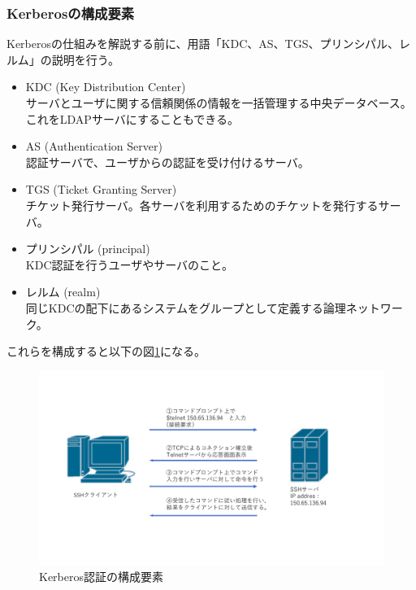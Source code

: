 \documentclass[11pt,a4j,titlepage]{jreport}
\begin{document}
\subsubsection*{Kerberosの構成要素}
Kerberosの仕組みを解説する前に、用語「KDC、AS、TGS、プリンシパル、レルム」の説明を行う。
\begin{itemize}
    \setlength{\parskip}{0.1cm} %
    \setlength{\itemsep}{0.1cm} 
    \item KDC (Key Distribution Center)\mbox{}\\サーバとユーザに関する信頼関係の情報を一括管理する中央データベース。これをLDAPサーバにすることもできる。
    \item AS (Authentication Server) \mbox{}\\認証サーバで、ユーザからの認証を受け付けるサーバ。
    \item TGS (Ticket Granting Server) \mbox{}\\チケット発行サーバ。各サーバを利用するためのチケットを発行するサーバ。
    \item プリンシパル (principal) \mbox{}\\ KDC認証を行うユーザやサーバのこと。
    \item レルム (realm)\mbox{}\\同じKDCの配下にあるシステムをグループとして定義する論理ネットワーク。
\end{itemize}
これらを構成すると以下の図\ref{KerberosCompornent}になる。
\begin{figure}[h]
    \begin{center}
        \includegraphics[width=1.0\textwidth, page=11]{graphs/network_archtecture.pdf}
        \caption{Kerberos認証の構成要素}
        \label{KerberosCompornent}
    \end{center}
\end{figure}\\
\end{document}
